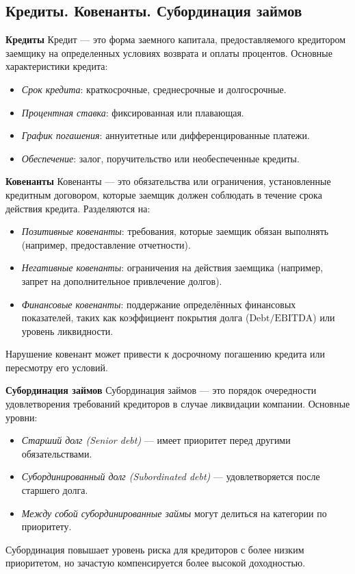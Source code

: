 \pagebreak
\subsection{Кредиты. Ковенанты. Субординация займов}

\textbf{Кредиты}
Кредит --- это форма заемного капитала, предоставляемого кредитором заемщику на определенных условиях возврата и оплаты процентов. Основные характеристики кредита:
\begin{itemize}
    \item \textit{Срок кредита}: краткосрочные, среднесрочные и долгосрочные.
    \item \textit{Процентная ставка}: фиксированная или плавающая.
    \item \textit{График погашения}: аннуитетные или дифференцированные платежи.
    \item \textit{Обеспечение}: залог, поручительство или необеспеченные кредиты.
\end{itemize}

\textbf{Ковенанты}
Ковенанты --- это обязательства или ограничения, установленные кредитным договором, которые заемщик должен соблюдать в течение срока действия кредита. Разделяются на:
\begin{itemize}
    \item \textit{Позитивные ковенанты}: требования, которые заемщик обязан выполнять (например, предоставление отчетности).
    \item \textit{Негативные ковенанты}: ограничения на действия заемщика (например, запрет на дополнительное привлечение долгов).
    \item \textit{Финансовые ковенанты}: поддержание определённых финансовых показателей, таких как коэффициент покрытия долга ($\text{Debt/EBITDA}$) или уровень ликвидности.
\end{itemize}
Нарушение ковенант может привести к досрочному погашению кредита или пересмотру его условий.

\textbf{Субординация займов}
Субординация займов --- это порядок очередности удовлетворения требований кредиторов в случае ликвидации компании. Основные уровни:
\begin{itemize}
    \item \textit{Старший долг (Senior debt)} --- имеет приоритет перед другими обязательствами.
    \item \textit{Субординированный долг (Subordinated debt)} --- удовлетворяется после старшего долга.
    \item \textit{Между собой субординированные займы} могут делиться на категории по приоритету.
\end{itemize}
Субординация повышает уровень риска для кредиторов с более низким приоритетом, но зачастую компенсируется более высокой доходностью.



